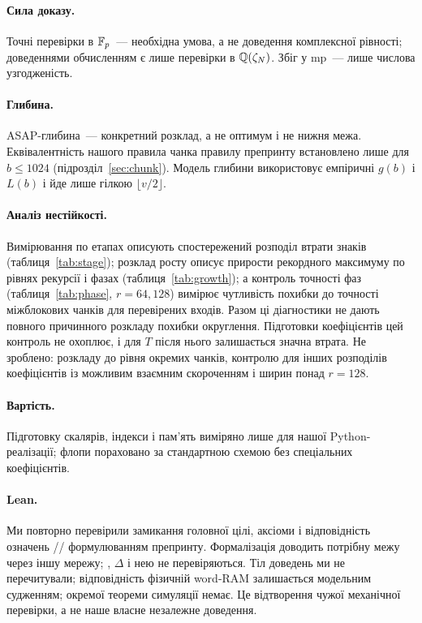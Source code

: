 \documentclass[11pt]{article}
\theoremstyle{plain}
\begin{document}
\paragraph{Сила доказу.}
Точні перевірки в $\mathbb{F}_p$~--- необхідна умова, а не доведення комплексної рівності; доведеннями обчисленням є лише перевірки в $\mathbb{Q}(\zeta_N)$. Збіг у mp~--- лише числова узгодженість.

\paragraph{Глибина.}
ASAP-глибина~--- конкретний розклад, а не оптимум і не нижня межа. Еквівалентність нашого правила чанка правилу препринту встановлено лише для $b\le1024$ (підрозділ~\ref{sec:chunk}). Модель глибини використовує емпіричні $g(b)$ і $L(b)$ і йде лише гілкою $\lfloor v/2\rfloor$.

\paragraph{Аналіз нестійкості.}
Вимірювання по етапах описують спостережений розподіл втрати знаків (таблиця~\ref{tab:stage}); розклад росту описує прирости рекордного максимуму по рівнях рекурсії і фазах (таблиця~\ref{tab:growth}); а контроль точності фаз (таблиця~\ref{tab:phase}, $r=64,128$) вимірює чутливість похибки до точності міжблокових чанків для перевірених входів. Разом ці діагностики не дають повного причинного розкладу похибки округлення. Підготовки коефіцієнтів цей контроль не охоплює, і для $T$ після нього залишається значна втрата. Не зроблено: розкладу до рівня окремих чанків, контролю для інших розподілів коефіцієнтів із можливим взаємним скороченням і ширин понад $r=128$.

\paragraph{Вартість.}
Підготовку скалярів, індекси і пам'ять виміряно лише для нашої Python-реалізації; флопи пораховано за стандартною схемою без спеціальних коефіцієнтів.

\paragraph{Lean.}
Ми повторно перевірили замикання головної цілі, аксіоми і відповідність означень // формулюванням препринту. Формалізація доводить потрібну межу через іншу мережу; , $\Delta$ і  нею не перевіряються. Тіл доведень ми не перечитували; відповідність  фізичній word-RAM залишається модельним судженням; окремої теореми симуляції немає. Це відтворення чужої механічної перевірки, а не наше власне незалежне доведення.
\end{document}
